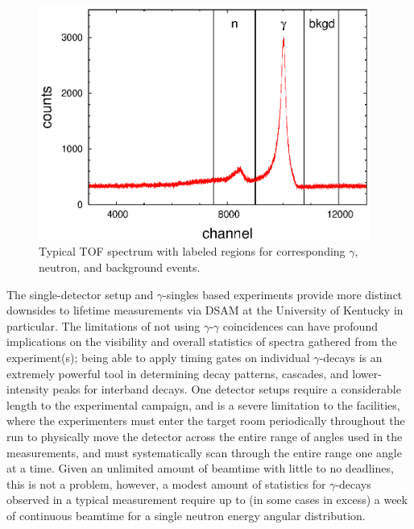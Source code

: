 \begin{figure}[h] 
\begin{center}
\includegraphics[width=0.97\textwidth]{figures/TAC_spectrum.eps}
\caption{Typical TOF spectrum with labeled regions for corresponding $\gamma$, neutron, and background events.\label{fig:TOF_spec}} %
\end{center}
\end{figure}

The single-detector setup and $\gamma$-singles based experiments provide more distinct downsides to lifetime measurements via DSAM at the University of Kentucky in particular. The limitations of not using $\gamma$-$\gamma$ coincidences can have profound implications on the visibility and overall statistics of spectra gathered from the experiment(s); being able to apply timing gates on individual $\gamma$-decays is an extremely powerful tool in determining decay patterns, cascades, and lower-intensity peaks for interband decays. One detector setups require a considerable length to the experimental campaign, and is a severe limitation to the facilities, where the experimenters must enter the target room periodically throughout the run to physically move the detector across the entire range of angles used in the measurements, and must systematically scan through the entire range one angle at a time. Given an unlimited amount of beamtime with little to no deadlines, this is not a problem, however, a modest amount of statistics for $\gamma$-decays observed in a typical measurement require up to (in some cases in excess) a week of continuous beamtime for a single neutron energy angular distribution. 


